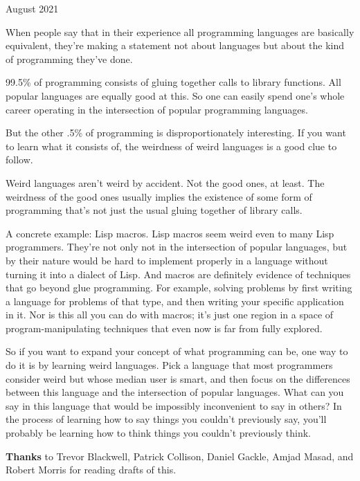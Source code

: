 August 2021

When people say that in their experience all programming languages are
basically equivalent, they're making a statement not about languages but
about the kind of programming they've done.

99.5\% of programming consists of gluing together calls to library
functions. All popular languages are equally good at this. So one can
easily spend one's whole career operating in the intersection of popular
programming languages.

But the other .5\% of programming is disproportionately interesting. If
you want to learn what it consists of, the weirdness of weird languages
is a good clue to follow.

Weird languages aren't weird by accident. Not the good ones, at least.
The weirdness of the good ones usually implies the existence of some
form of programming that's not just the usual gluing together of library
calls.

A concrete example: Lisp macros. Lisp macros seem weird even to many
Lisp programmers. They're not only not in the intersection of popular
languages, but by their nature would be hard to implement properly in a
language without turning it into a dialect of Lisp. And macros are
definitely evidence of techniques that go beyond glue programming. For
example, solving problems by first writing a language for problems of
that type, and then writing your specific application in it. Nor is this
all you can do with macros; it's just one region in a space of
program-manipulating techniques that even now is far from fully
explored.

So if you want to expand your concept of what programming can be, one
way to do it is by learning weird languages. Pick a language that most
programmers consider weird but whose median user is smart, and then
focus on the differences between this language and the intersection of
popular languages. What can you say in this language that would be
impossibly inconvenient to say in others? In the process of learning how
to say things you couldn't previously say, you'll probably be learning
how to think things you couldn't previously think.

\textbf{Thanks} to Trevor Blackwell, Patrick Collison, Daniel Gackle,
Amjad Masad, and Robert Morris for reading drafts of this.
